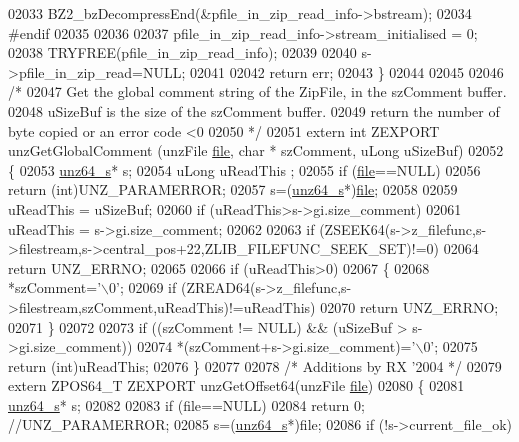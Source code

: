 \begin{DoxyCode}
02033         BZ2\_bzDecompressEnd(&pfile\_in\_zip\_read\_info->bstream);
02034 \textcolor{preprocessor}{#endif}
02035 
02036 
02037     pfile\_in\_zip\_read\_info->stream\_initialised = 0;
02038     TRYFREE(pfile\_in\_zip\_read\_info);
02039 
02040     s->pfile\_in\_zip\_read=NULL;
02041 
02042     \textcolor{keywordflow}{return} err;
02043 \}
02044 
02045 
02046 \textcolor{comment}{/*}
02047 \textcolor{comment}{  Get the global comment string of the ZipFile, in the szComment buffer.}
02048 \textcolor{comment}{  uSizeBuf is the size of the szComment buffer.}
02049 \textcolor{comment}{  return the number of byte copied or an error code <0}
02050 \textcolor{comment}{*/}
02051 \textcolor{keyword}{extern} \textcolor{keywordtype}{int} ZEXPORT unzGetGlobalComment (unzFile \hyperlink{structfile}{file}, \textcolor{keywordtype}{char} * szComment, uLong uSizeBuf)
02052 \{
02053     \hyperlink{structunz64__s}{unz64\_s}* s;
02054     uLong uReadThis ;
02055     \textcolor{keywordflow}{if} (\hyperlink{structfile}{file}==NULL)
02056         \textcolor{keywordflow}{return} (\textcolor{keywordtype}{int})UNZ\_PARAMERROR;
02057     s=(\hyperlink{structunz64__s}{unz64\_s}*)\hyperlink{structfile}{file};
02058 
02059     uReadThis = uSizeBuf;
02060     \textcolor{keywordflow}{if} (uReadThis>s->gi.size\_comment)
02061         uReadThis = s->gi.size\_comment;
02062 
02063     \textcolor{keywordflow}{if} (ZSEEK64(s->z\_filefunc,s->filestream,s->central\_pos+22,ZLIB\_FILEFUNC\_SEEK\_SET)!=0)
02064         \textcolor{keywordflow}{return} UNZ\_ERRNO;
02065 
02066     \textcolor{keywordflow}{if} (uReadThis>0)
02067     \{
02068       *szComment=\textcolor{charliteral}{'\(\backslash\)0'};
02069       \textcolor{keywordflow}{if} (ZREAD64(s->z\_filefunc,s->filestream,szComment,uReadThis)!=uReadThis)
02070         \textcolor{keywordflow}{return} UNZ\_ERRNO;
02071     \}
02072 
02073     \textcolor{keywordflow}{if} ((szComment != NULL) && (uSizeBuf > s->gi.size\_comment))
02074         *(szComment+s->gi.size\_comment)=\textcolor{charliteral}{'\(\backslash\)0'};
02075     \textcolor{keywordflow}{return} (\textcolor{keywordtype}{int})uReadThis;
02076 \}
02077 
02078 \textcolor{comment}{/* Additions by RX '2004 */}
02079 \textcolor{keyword}{extern} ZPOS64\_T ZEXPORT unzGetOffset64(unzFile \hyperlink{structfile}{file})
02080 \{
02081     \hyperlink{structunz64__s}{unz64\_s}* s;
02082 
02083     \textcolor{keywordflow}{if} (file==NULL)
02084           \textcolor{keywordflow}{return} 0; \textcolor{comment}{//UNZ\_PARAMERROR;}
02085     s=(\hyperlink{structunz64__s}{unz64\_s}*)file;
02086     \textcolor{keywordflow}{if} (!s->current\_file\_ok)

\end{DoxyCode}
